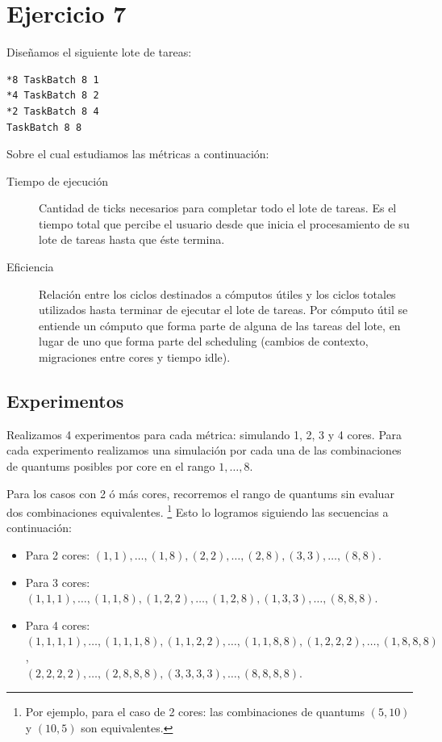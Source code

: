 \documentclass[a4paper,10pt,twoside]{article}
\begin{document}


\section{Ejercicio 7}

Diseñamos el siguiente lote de tareas:

\begin{verbatim}
*8 TaskBatch 8 1
*4 TaskBatch 8 2
*2 TaskBatch 8 4
TaskBatch 8 8
\end{verbatim}

Sobre el cual estudiamos las métricas a continuación:

\begin{description}
	\item[Tiempo de ejecución]
	Cantidad de ticks necesarios para completar todo el lote de tareas. Es el tiempo total que percibe el usuario desde que inicia el procesamiento de su lote de tareas hasta que éste termina.

	\item[Eficiencia]
	Relación entre los ciclos destinados a cómputos útiles y los ciclos totales utilizados hasta terminar de ejecutar el lote de tareas. Por cómputo útil se entiende un cómputo que forma parte de alguna de las tareas del lote, en lugar de uno que forma parte del scheduling (cambios de contexto, migraciones entre cores y tiempo idle).
\end{description}


\subsection{Experimentos}

Realizamos 4 experimentos para cada métrica: simulando 1, 2, 3 y 4 cores. Para cada experimento realizamos una simulación por cada una de las combinaciones de quantums posibles por core en el rango $1, \ldots, 8$.

Para los casos con 2 ó más cores, recorremos el rango de quantums sin evaluar dos combinaciones equivalentes. \footnote{Por ejemplo, para el caso de 2 cores: las combinaciones de quantums $(5, 10)$ y $(10, 5)$ son equivalentes.} Esto lo logramos siguiendo las secuencias a continuación:

\begin{itemize}
	\item{
		Para 2 cores:
		$(1, 1), \ldots, (1, 8),
		 (2, 2), \ldots, (2, 8),
		 (3, 3), \ldots, (8, 8)$.
	}
	\item{
		Para 3 cores:
		$(1, 1, 1), \ldots, (1, 1, 8),
		 (1, 2, 2), \ldots, (1, 2, 8),
		 (1, 3, 3), \ldots, (8, 8, 8)$.
	}	
	\item{
		Para 4 cores:
		$(1, 1, 1, 1), \ldots, (1, 1, 1, 8),
		 (1, 1, 2, 2), \ldots, (1, 1, 8, 8),
		 (1, 2, 2, 2), \ldots, (1, 8, 8, 8)$, \\
		\hspace*{5.7em}
		$(2, 2, 2, 2), \ldots, (2, 8, 8, 8),
		 (3, 3, 3, 3), \ldots, (8, 8, 8, 8)$.
	}
\end{itemize}
\end{document}
